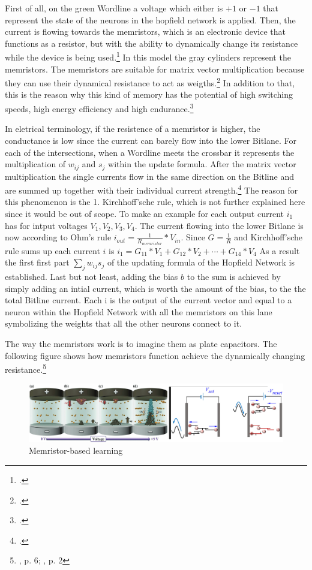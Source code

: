 First of all, on the green Wordline a voltage which either is \( +1 \) or \( -1 \) that represent the state of the neurons in the hopfield network is applied.
Then, the current is flowing towards the memristors, which is an electronic device that functions as a resistor, but with the ability to dynamically change its resistance while the device is being used.\footcite[cf][124]{sungPerspectiveReviewMemristive2018}
In this model the gray cylinders represent the memristors.
The memristors are suitable for matrix vector multiplication because they can use their dynamical resistance to act as weigths.\footcite[cf][124]{sungPerspectiveReviewMemristive2018}
In addition to that, this is the reason why this kind of memory has the potential of high switching speeds, high energy efficiency and high endurance.\footcite[cf.][3]{amirsoleimaniInMemoryVectorMatrixMultiplication2020}

In eletrical terminology, if the resistence of a memristor is higher, the conductance is low since the current can barely flow into the lower Bitlane.
For each of the intersections, when a Wordline meets the crossbar it represents the multiplication of \(w_{ij}\) and \(s_j\) within the update formula.
After the matrix vector multiplication the single currents flow in the same direction on the Bitline and are summed up together with their individual current strength.\footcite[cf.][3]{amirsoleimaniInMemoryVectorMatrixMultiplication2020}
The reason for this phenomenon is the 1. Kirchhoff'sche rule, which is not further explained here since it would be out of scope.
To make an example for each output current \(i_{1}\) has for intput voltages \(V_{1}, V_{2}, V_{3}, V_{4}\).
The current flowing into the lower Bitlane is now according to Ohm's rule \( i_{out} = \frac{1}{R_{memristor}} * V_{in}\).
Since \( G = \frac{1}{R}\) and Kirchhoff'sche rule sums up each current \(i\) is \( i_{1} = G_{11}*V_1 + G_{12}*V_2 + \cdots + G_{14}*V_4\)
As a result the first first part \(\sum_j w_{ij} s_j\) of the updating formula of the Hopfield Network is established.
Last but not least, adding the bias \(b\) to the sum is achieved by simply adding an intial current, which is worth the amount of the bias, to the the total Bitline current.
Each i is the output of the current vector and equal to a neuron within the Hopfield Network with all the memristors on this lane symbolizing the weights that all the other neurons connect to it.

The way the memristors work is to imagine them as plate capacitors. 
The following figure shows how memristors function achieve the dynamically changing resistance.\footnote{\cite{changDirectObservationDualFilament2017}, p. 6; \cite{sungPerspectiveReviewMemristive2018}, p. 2}
\begin{figure}[H]
    \centering
    \includegraphics[width=0.9\linewidth]{graphics/Memristor_filoments.png}
    \caption{Memristor-based learning}
    \label{platecondensator}
\end{figure}

